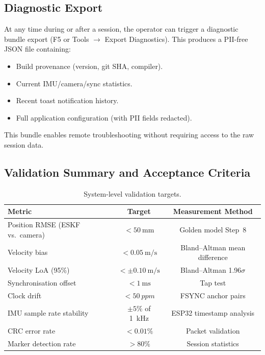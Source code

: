 \subsection{Diagnostic Export}

At any time during or after a session, the operator can trigger a diagnostic bundle export (F5 or Tools $\rightarrow$ Export Diagnostics).
This produces a PII-free JSON file containing:
\begin{itemize}[nosep]
  \item Build provenance (version, git SHA, compiler).
  \item Current IMU/camera/sync statistics.
  \item Recent toast notification history.
  \item Full application configuration (with PII fields redacted).
\end{itemize}

This bundle enables remote troubleshooting without requiring access to the raw session data.


\subsection{Validation Summary and Acceptance Criteria}

\begin{table}[H]
  \centering
  \caption{System-level validation targets.}
  \label{tab:validation_summary}
  \begin{tabular}{lcc}
    \toprule
    \textbf{Metric} & \textbf{Target} & \textbf{Measurement Method} \\
    \midrule
    Position RMSE (ESKF vs.\ camera)    & $< \SI{50}{\milli\metre}$         & Golden model Step~8 \\
    Velocity bias                       & $< \SI{0.05}{\metre\per\second}$   & Bland--Altman mean difference \\
    Velocity LoA (95\%)                 & $< \pm\SI{0.10}{\metre\per\second}$ & Bland--Altman 1.96$\sigma$ \\
    Synchronisation offset              & $< \SI{1}{\milli\second}$         & Tap test \\
    Clock drift                         & $< \SI{50}{ppm}$                  & FSYNC anchor pairs \\
    IMU sample rate stability           & $\pm 5\%$ of \SI{1}{\kilo\hertz}  & ESP32 timestamp analysis \\
    CRC error rate                      & $< 0.01\%$                        & Packet validation \\
    Marker detection rate               & $> 80\%$                          & Session statistics \\
    \bottomrule
  \end{tabular}
\end{table}

